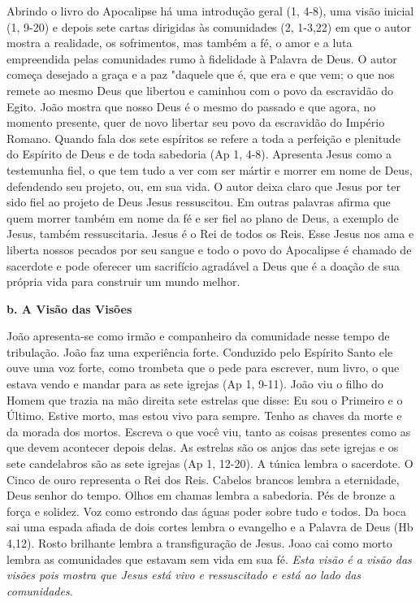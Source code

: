 \documentclass[
]{book}
\begin{document}
Abrindo o livro do Apocalipse há uma introdução geral (1, 4-8), uma visão inicial (1, 9-20) e depois sete cartas dirigidas às comunidades (2, 1-3,22) em que o autor mostra a realidade, os sofrimentos, mas também a fé, o amor e a luta empreendida pelas comunidades rumo à fidelidade à Palavra de Deus. O autor começa desejado a graça e a paz "daquele que é, que era e que vem; o que nos remete ao mesmo Deus que libertou e caminhou com o povo da escravidão do Egito. João mostra que nosso Deus é o mesmo do passado e que agora, no momento presente, quer de novo libertar seu povo da escravidão do Império Romano. Quando fala dos sete espíritos se refere a toda a perfeição e plenitude do Espírito de Deus e de toda sabedoria (Ap 1, 4-8). Apresenta Jesus como a testemunha fiel, o que tem tudo a ver com ser mártir e morrer em nome de Deus, defendendo seu projeto, ou, em sua vida. O autor deixa claro que Jesus por ter sido fiel ao projeto de Deus Jesus ressuscitou. Em outras palavras afirma que quem morrer também em nome da fé e ser fiel ao plano de Deus, a exemplo de Jesus, também ressuscitaria. Jesus é o Rei de todos os Reis. Esse Jesus nos ama e liberta nossos pecados por seu sangue e todo o povo do Apocalipse é chamado de sacerdote e pode oferecer um sacrifício agradável a Deus que é a doação de sua própria vida para construir um mundo melhor.

\textbf{b. A Visão das Visões}

João apresenta-se como irmão e companheiro da comunidade nesse tempo de tribulação. João faz uma experiência forte. Conduzido pelo Espírito Santo ele ouve uma voz forte, como trombeta que o pede para escrever, num livro, o que estava vendo e mandar para as sete igrejas (Ap 1, 9-11). João viu o filho do Homem que trazia na mão direita sete estrelas que disse: Eu sou o Primeiro e o Último. Estive morto, mas estou vivo para sempre. Tenho as chaves da morte e da morada dos mortos. Escreva o que você viu, tanto as coisas presentes como as que devem acontecer depois delas. As estrelas são os anjos das sete igrejas e os sete candelabros são as sete igrejas (Ap 1, 12-20). A túnica lembra o sacerdote. O Cinco de ouro representa o Rei dos Reis. Cabelos brancos lembra a eternidade, Deus senhor do tempo. Olhos em chamas lembra a sabedoria. Pés de bronze a força e solidez. Voz como estrondo das águas poder sobre tudo e todos. Da boca sai uma espada afiada de dois cortes lembra o evangelho e a Palavra de Deus (Hb 4,12). Rosto brilhante lembra a transfiguração de Jesus. Joao cai como morto lembra as comunidades que estavam sem vida em sua fé. \emph{Esta visão é a visão das visões pois mostra que Jesus está vivo e ressuscitado e está ao lado das comunidades}.
\end{document}
